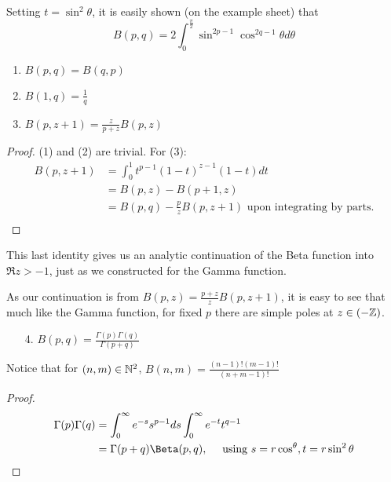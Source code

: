 \documentclass[a4paper]{article}
\begin{document}
Setting $t = \sin^2\theta$, it is easily shown (on the example sheet) that
\[
	B(p,q) = 2 \int_0^{\frac{\pi}{2}} \sin^{2p-1} \cos^{2q-1} \theta d\theta
\]

\begin{prop}
	\begin{enumerate}
		\item $B(p,q) = B(q,p)$ \\
		\item  $B(1,q) = \frac{1}{q}$ \\
		\item $B(p,z+1) = \frac{z}{p+z} B(p, z)$
	\end{enumerate}
\end{prop}
\begin{proof}
	(1) and (2) are trivial.
	For (3): 
	\begin{align*}
		B(p,z+1) &= \int_0^{1} t^{p-1} (1-t)^{z-1} (1-t) dt \\
			 &= B(p,z) - B(p+1, z) \\
			 &= B(p,q) - \frac{p}{z} B(p, z+1) \text{ upon integrating by parts.}\\
	\end{align*}
\end{proof}

This last identity gives us an analytic continuation of the Beta function into $\Re z > -1$, just as we constructed for the Gamma function.

As our continuation is from $B(p,z) = \frac{p+z}{z} B(p, z+1)$, it is easy to see that much like the Gamma function, for fixed $p$ there are simple poles at $z \in (-\mathbb{Z})$.

\begin{prop}
	\begin{enumerate}
		\item[4.] $B(p,q) = \frac{\Gamma(p)\Gamma(q)}{\Gamma(p+q)}$ 
	\end{enumerate}
\end{prop}

Notice that for $(n,m) \in \mathbb{N}^2$, $B(n,m) = \frac{(n-1)!(m-1)!}{(n+m-1)!}$ 

\begin{proof}
	 \begin{align*}
		 \Gamma(p)\Gamma(q) &= \int_0^{\infty} e^{-s} s^{p-1} ds \int_0^{\infty} e^{-t} t^{q-1} \\
				    &= \Gamma(p+q) \Beta(p,q), \quad \text{ using } s = r\cos^\theta, t = r \sin^2\theta 
	\end{align*}
\end{proof}
\end{document}
